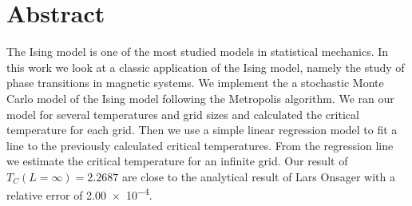 \section*{Abstract}
The Ising model is one of the most studied models in statistical mechanics. In
this work we look at a classic application of the Ising model, namely
the study of phase transitions in magnetic systems.
We implement the a stochastic Monte Carlo model of the Ising model following the
Metropolis algorithm. We ran our model for several temperatures and grid
sizes and calculated the critical temperature for each grid. Then we use a
simple linear regression model to fit a line to the previously calculated
critical temperatures. From the regression line we estimate the critical
temperature for an infinite grid. Our result of $T_C(L=\infty)=2.2687$ are close
to the analytical result of Lars Onsager \parencite{Lars1944} with a relative error of \num{2.00e-4}.

